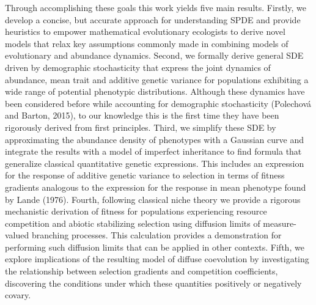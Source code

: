 \documentclass[]{elsarticle} %
\begin{document}
Through accomplishing these goals this work yields five main results.
Firstly, we develop a concise, but accurate approach for understanding
SPDE and provide heuristics to empower mathematical evolutionary
ecologists to derive novel models that relax key assumptions commonly
made in combining models of evolutionary and abundance dynamics. Second,
we formally derive general SDE driven by demographic stochasticity that
express the joint dynamics of abundance, mean trait and additive genetic
variance for populations exhibiting a wide range of potential phenotypic
distributions. Although these dynamics have been considered before while
accounting for demographic stochasticity (Polechová and Barton, 2015),
to our knowledge this is the first time they have been rigorously
derived from first principles. Third, we simplify these SDE by
approximating the abundance density of phenotypes with a Gaussian curve
and integrate the results with a model of imperfect inheritance to find
formula that generalize classical quantitative genetic expressions. This
includes an expression for the response of additive genetic variance to
selection in terms of fitness gradients analogous to the expression for
the response in mean phenotype found by Lande (1976). Fourth, following
classical niche theory we provide a rigorous mechanistic derivation of
fitness for populations experiencing resource competition and abiotic
stabilizing selection using diffusion limits of measure-valued branching
processes. This calculation provides a demonstration for performing such
diffusion limits that can be applied in other contexts. Fifth, we
explore implications of the resulting model of diffuse coevolution by
investigating the relationship between selection gradients and
competition coefficients, discovering the conditions under which these
quantities positively or negatively covary.
\end{document}
